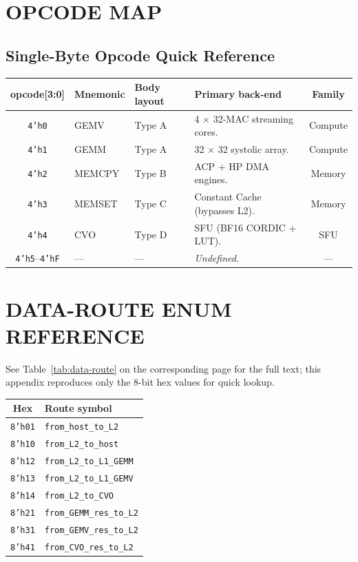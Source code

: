 \documentclass[11pt,a4paper,twoside,openany]{report}
\begin{document}
\appendix

\chapter{OPCODE MAP}

\section{Single-Byte Opcode Quick Reference}

\begin{longtable}{|c|l|l|p{5.5cm}|c|}
\hline
\rowcolor{skytint}
\textbf{opcode[3:0]} & \textbf{Mnemonic} & \textbf{Body layout} & \textbf{Primary back-end} & \textbf{Family} \\
\hline
\endfirsthead
\texttt{4'h0} & GEMV   & Type A & 4 $\times$ 32-MAC streaming cores.   & Compute \\
\hline
\texttt{4'h1} & GEMM   & Type A & 32 $\times$ 32 systolic array.       & Compute \\
\hline
\texttt{4'h2} & MEMCPY & Type B & ACP + HP DMA engines.                & Memory \\
\hline
\texttt{4'h3} & MEMSET & Type C & Constant Cache (bypasses L2).        & Memory \\
\hline
\texttt{4'h4} & CVO    & Type D & SFU (BF16 CORDIC + LUT).             & SFU \\
\hline
\texttt{4'h5}--\texttt{4'hF} & --- & --- & \textit{Undefined}. & --- \\
\hline
\end{longtable}

\chapter{DATA-ROUTE ENUM REFERENCE}

See Table~\ref{tab:data-route} on the corresponding page for the
full text; this appendix reproduces only the 8-bit hex values for
quick lookup.

\begin{longtable}{|c|l|}
\hline
\rowcolor{skytint}
\textbf{Hex} & \textbf{Route symbol} \\
\hline
\endfirsthead
\texttt{8'h01} & \texttt{from\_host\_to\_L2} \\
\hline
\texttt{8'h10} & \texttt{from\_L2\_to\_host} \\
\hline
\texttt{8'h12} & \texttt{from\_L2\_to\_L1\_GEMM} \\
\hline
\texttt{8'h13} & \texttt{from\_L2\_to\_L1\_GEMV} \\
\hline
\texttt{8'h14} & \texttt{from\_L2\_to\_CVO} \\
\hline
\texttt{8'h21} & \texttt{from\_GEMM\_res\_to\_L2} \\
\hline
\texttt{8'h31} & \texttt{from\_GEMV\_res\_to\_L2} \\
\hline
\texttt{8'h41} & \texttt{from\_CVO\_res\_to\_L2} \\
\hline
\end{longtable}
\end{document}
